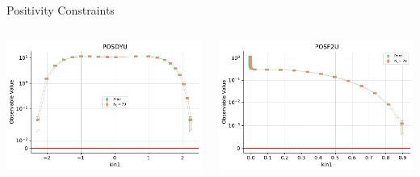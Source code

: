 \begin{frame}{Positivity Constraints}
	\begin{columns}[T] 
		\begin{column}{.5\textwidth}
			\includegraphics[width=\linewidth]{./gan_compressor/imgs/POSDYU.pdf}
		\end{column}
		\hfill
		\begin{column}{.5\textwidth}	
			\includegraphics[width=\linewidth]{./gan_compressor/imgs/POSF2U.pdf}
		\end{column}
	\end{columns}
\end{frame}


